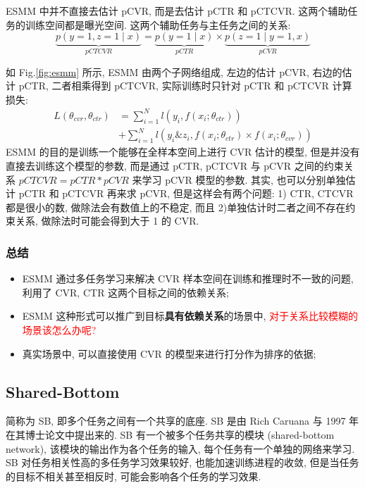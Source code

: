 ESMM 中并不直接去估计 pCVR, 而是去估计 pCTR 和 pCTCVR. 这两个辅助任务的训练空间都是曝光空间. 这两个辅助任务与主任务之间的关系:
$$
\underbrace{p(y=1, z=1 \mid x)}_{p C T C V R}=\underbrace{p(y=1 \mid x)}_{p C T R} \times \underbrace{p(z=1 \mid y=1, x)}_{p C V R}
$$

如 Fig.\ref{fig:esmm} 所示, ESMM 由两个子网络组成, 左边的估计 pCVR, 右边的估计 pCTR, 二者相乘得到 pCTCVR, 实际训练时只针对 pCTR 和 pCTCVR 计算损失:
$$
\begin{aligned}
	L\left(\theta_{c v r}, \theta_{c t r}\right) &=\sum_{i=1}^{N} l\left(y_{i}, f\left(x_{i} ; \theta_{c t r}\right)\right) \\
	&+\sum_{i=1}^{N} l\left(y_{i} \& z_{i}, f\left(x_{i} ; \theta_{c t r}\right) \times f\left(x_{i} ; \theta_{c v r}\right)\right)
\end{aligned}
$$
ESMM 的目的是训练一个能够在全样本空间上进行 CVR 估计的模型, 但是并没有直接去训练这个模型的参数, 而是通过 pCTR, pCTCVR 与 pCVR 之间的约束关系 $pCTCVR = pCTR * pCVR$ 来学习 pCVR 模型的参数. 其实, 也可以分别单独估计 pCTR 和 pCTCVR 再来求 pCVR, 但是这样会有两个问题: 1) CTR, CTCVR 都是很小的数, 做除法会有数值上的不稳定, 而且 2)单独估计时二者之间不存在约束关系, 做除法时可能会得到大于 1 的 CVR.

\subsubsection{总结}
\begin{itemize}
	\item ESMM 通过多任务学习来解决 CVR 样本空间在训练和推理时不一致的问题, 利用了 CVR, CTR 这两个目标之间的依赖关系;
	
	\item ESMM 这种形式可以推广到目标\textbf{具有依赖关系}的场景中, \textcolor{red}{对于关系比较模糊的场景该怎么办呢?}
	
	\item 真实场景中, 可以直接使用 CVR 的模型来进行打分作为排序的依据;
\end{itemize}

\subsection{Shared-Bottom}
简称为 SB, 即多个任务之间有一个共享的底座. SB 是由 Rich Caruana 与 1997 年在其博士论文中提出来的. SB 有一个被多个任务共享的模块 (shared-bottom network), 该模块的输出作为各个任务的输入, 每个任务有一个单独的网络来学习. SB 对任务相关性高的多任务学习效果较好, 也能加速训练进程的收敛, 但是当任务的目标不相关甚至相反时, 可能会影响各个任务的学习效果.

